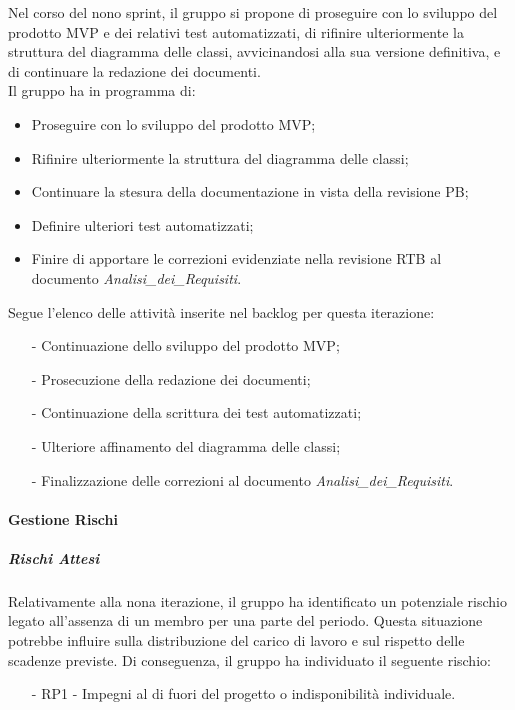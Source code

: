 \documentclass[10pt]{article}
\begin{document}
{{{{{{{{{{        Nel corso del nono sprint, il gruppo si propone di proseguire con lo sviluppo del prodotto MVP e dei relativi test automatizzati, di rifinire ulteriormente la struttura del diagramma delle classi, avvicinandosi alla sua versione definitiva, e di continuare la redazione dei documenti.\\
        Il gruppo ha in programma di:
        \begin{itemize}
            \item Proseguire con lo sviluppo del prodotto MVP;
            \item Rifinire ulteriormente la struttura del diagramma delle classi;
            \item Continuare la stesura della documentazione in vista della revisione PB;
            \item Definire ulteriori test automatizzati;
            \item Finire di apportare le correzioni evidenziate nella revisione RTB al documento \textit{Analisi\_dei\_Requisiti}.
        \end{itemize}
        Segue l'elenco delle attività inserite nel backlog per questa iterazione:
        \vspace{-0.5em}
        \begin{itemize}
        \setlength\itemsep{-0.2em}
            \item [-] Continuazione dello sviluppo del prodotto MVP;
            \item [-] Prosecuzione della redazione dei documenti;
            \item [-] Continuazione della scrittura dei test automatizzati;
            \item [-] Ulteriore affinamento del diagramma delle classi;
            \item [-] Finalizzazione delle correzioni al documento \textit{Analisi\_dei\_Requisiti}.
        \end{itemize}

        \paragraph{Gestione Rischi}\mbox{}
        \vspace{-1em}
        \subparagraph*{Rischi Attesi}\mbox{}
        
        Relativamente alla nona iterazione, il gruppo ha identificato un potenziale rischio legato all'assenza di un membro per una parte del periodo. Questa situazione potrebbe influire sulla distribuzione del carico di lavoro e sul rispetto delle scadenze previste. Di conseguenza, il gruppo ha individuato il seguente rischio:
        \vspace{-0.5em}
        \begin{itemize}
        \setlength\itemsep{-0.2em}
        \item [-] RP1 - Impegni al di fuori del progetto o indisponibilità individuale.
        \end{itemize}

}}}}}}}}}}
\end{document}
